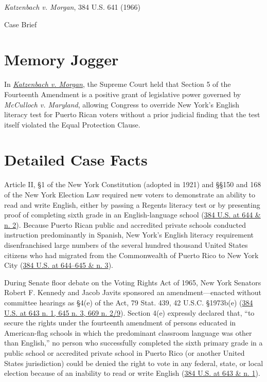 \documentclass[12pt]{article}
\begin{document}
\begin{center}
{\LARGE \textit{Katzenbach v. Morgan}, 384 U.S. 641 (1966)\par}
\vspace{0.8em}
{\large Case Brief\par}
\end{center}
\vspace{1em}

\section{Memory Jogger}

In \href{https://www.courtlistener.com/opinion/107256/katzenbach-v-morgan/}{\textit{Katzenbach v. Morgan}}, the Supreme Court held that Section 5 of the Fourteenth Amendment is a positive grant of legislative power governed by \textit{McCulloch v. Maryland}, allowing Congress to override New York's English literacy test for Puerto Rican voters without a prior judicial finding that the test itself violated the Equal Protection Clause.

\section{Detailed Case Facts}

Article II, \S 1 of the New York Constitution (adopted in 1921) and \S\S 150 and 168 of the New York Election Law required new voters to demonstrate an ability to read and write English, either by passing a Regents literacy test or by presenting proof of completing sixth grade in an English-language school (\href{https://supreme.justia.com/cases/federal/us/384/641/}{384 U.S. at 644 \& n. 2}). Because Puerto Rican public and accredited private schools conducted instruction predominantly in Spanish, New York's English literacy requirement disenfranchised large numbers of the several hundred thousand United States citizens who had migrated from the Commonwealth of Puerto Rico to New York City (\href{https://supreme.justia.com/cases/federal/us/384/641/}{384 U.S. at 644--645 \& n. 3}).

During Senate floor debate on the Voting Rights Act of 1965, New York Senators Robert F. Kennedy and Jacob Javits sponsored an amendment---enacted without committee hearings as \S 4(e) of the Act, 79 Stat. 439, 42 U.S.C. \S 1973b(e) (\href{https://supreme.justia.com/cases/federal/us/384/641/}{384 U.S. at 643 n. 1, 645 n. 3, 669 n. 2/9}). Section 4(e) expressly declared that, ``to secure the rights under the fourteenth amendment of persons educated in American-flag schools in which the predominant classroom language was other than English,'' no person who successfully completed the sixth primary grade in a public school or accredited private school in Puerto Rico (or another United States jurisdiction) could be denied the right to vote in any federal, state, or local election because of an inability to read or write English (\href{https://supreme.justia.com/cases/federal/us/384/641/}{384 U.S. at 643 \& n. 1}).
\end{document}
